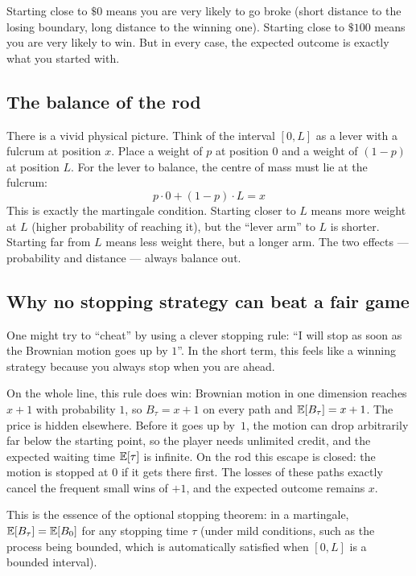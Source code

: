 \begin{notechapter}
Starting close to $\$0$ means you are very likely to go broke (short
distance to the losing boundary, long distance to the winning one). Starting
close to $\$100$ means you are very likely to win. But in every case, the
expected outcome is exactly what you started with.

\subsection*{The balance of the rod}

There is a vivid physical picture. Think of the interval $[0, L]$ as a
lever with a fulcrum at position $x$. Place a weight of $p$ at position $0$
and a weight of $(1-p)$ at position $L$. For the lever to balance, the
centre of mass must lie at the fulcrum:
\[
p \cdot 0 + (1-p) \cdot L = x
\]
This is exactly the martingale condition. Starting closer to $L$ means
more weight at $L$ (higher probability of reaching it), but the ``lever
arm'' to $L$ is shorter. Starting far from $L$ means less weight there, but
a longer arm. The two effects --- probability and distance --- always balance
out.

\subsection*{Why no stopping strategy can beat a fair game}

One might try to ``cheat'' by using a clever stopping rule: ``I will stop
as soon as the Brownian motion goes up by $1$''. In the short term, this
feels like a winning strategy because you always stop when you are ahead.

On the whole line, this rule does win: Brownian motion in one dimension
reaches $x + 1$ with probability $1$, so $B_\tau = x + 1$ on every path and
$\mathbb{E}[B_\tau] = x + 1$. The price is hidden elsewhere. Before it goes up by~$1$,
the motion can drop arbitrarily far below the starting point, so the player
needs unlimited credit, and the expected waiting time $\mathbb{E}[\tau]$ is infinite.
On the rod this escape is closed: the motion is stopped at $0$ if it gets
there first. The losses of these paths exactly cancel the frequent small wins
of $+1$, and the expected outcome remains $x$.

This is the essence of the optional stopping theorem: in a martingale,
$\mathbb{E}[B_\tau] = \mathbb{E}[B_0]$ for any stopping time $\tau$ (under mild
conditions, such as the process being bounded, which is automatically
satisfied when $[0, L]$ is a bounded interval).


\end{notechapter}
